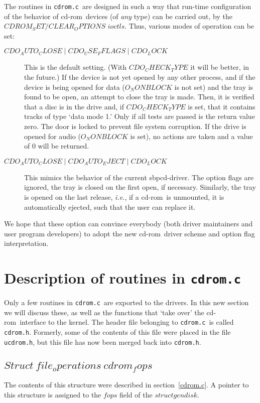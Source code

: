 \documentclass{article}
\newcommand{\newsection}[1]{\newpage\section{#1}}
\def\cdrom{{\sc cd-rom}}
\def\cdromc{{\tt {cdrom.c}}}
\def\cdromh{{\tt {cdrom.h}}}
\def\fo{\sl}                    %
\def\ie{{\fo i.e.}}
\begin{document}
The routines in \cdromc\ are designed in such a way that run-time
configuration of the behavior of \cdrom\ devices (of {\em any\/} type)
can be carried out, by the $CDROM_SET/CLEAR_OPTIONS$ $ioctls$. Thus, various
modes of operation can be set:
\begin{description}
\item[$CDO_AUTO_CLOSE \mathrel| CDO_USE_FFLAGS \mathrel| CDO_LOCK$] This
is the default setting. (With $CDO_CHECK_TYPE$ it will be better, in the
future.) If the device is not yet opened by any other process, and if
the device is being opened for data ($O_NONBLOCK$ is not set) and the
tray is found to be open, an attempt to close the tray is made. Then,
it is verified that a disc is in the drive and, if $CDO_CHECK_TYPE$ is
set, that it contains tracks of type `data mode 1.' Only if all tests
are passed is the return value zero. The door is locked to prevent file
system corruption. If the drive is opened for audio ($O_NONBLOCK$ is
set), no actions are taken and a value of 0 will be returned. 
\item[$CDO_AUTO_CLOSE \mathrel| CDO_AUTO_EJECT \mathrel| CDO_LOCK$] This
mimics the behavior of the current sbpcd-driver. The option flags are
ignored, the tray is closed on the first open, if necessary. Similarly,
the tray is opened on the last release, \ie, if a \cdrom\ is unmounted,
it is automatically ejected, such that the user can replace it.
\end{description} 
We hope that these option can convince everybody (both driver
maintainers and user program developers) to adopt the new \cdrom\
driver scheme and option flag interpretation.

\newsection{Description of routines in \cdromc}

Only a few routines in \cdromc\ are exported to the drivers. In this
new section we will discuss these, as well as the functions that `take
over' the \cdrom\ interface to the kernel. The header file belonging
to \cdromc\ is called \cdromh. Formerly, some of the contents of this
file were placed in the file {\tt {ucdrom.h}}, but this file has now been
merged back into \cdromh.

\subsection{$Struct\ file_operations\ cdrom_fops$}

The contents of this structure were described in section~\ref{cdrom.c}.
A pointer to this structure is assigned to the $fops$ field
of the $struct gendisk$.
\end{document}
